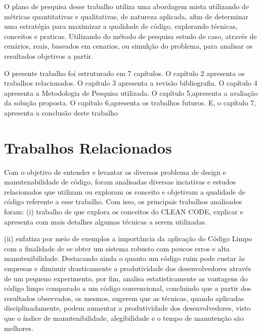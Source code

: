 \documentclass[12pt]{article}
\begin{document}
O plano de pesquisa desse trabalho utiliza uma abordagem mista utilizando de métricas quantitativas e qualitativas, de natureza aplicada, afim de determinar uma estratégia para maximizar a qualidade de código, explorando técnicas, conceitos e praticas. Utilizando do método de pesquisa estudo de caso, através de cenários, reais, baseados em cenarios, ou simulção do problema, para analisar os resultados objetivos a partir. 

O presente trabalho foi estruturado em 7 capítulos.
O capítulo 2 apresenta os trabalhos relacionados. 
O capítulo 3 apresenta a revisão bibliografia.
O capítulo 4 apresenta a Metodologia de Pesquisa utilizada. 
O capítulo 5,apresenta a avaliação da solução proposta.
O capítulo 6,apresenta os trabalhos futuros.
E, o capítulo 7, apresenta a conclusão deste trabalho

\part{Trabalhos Relacionados} \label{sec:trabalhosrelacionados}

Com o objetivo de entender e levantar os diversos problema de design e manutenabilidade de código, foram analisadas diversas inciativas e estudos relacionados que utilizam ou exploram os conceito e objetivam a qualidade de código referente a esse trabalho.
Com isso, os principais trabalhos analisados foram: (i) trabalho de \cite{TR_CLEAN_CODE_INTRODUCAO} que explora os conceitos do CLEAN CODE, explicar e apresenta com mais detalhes algumas técnicas a serem utilizadas.

 (ii) \cite{TR_CLEAN_CODE_IMPORTANCIA} enfatiza por meio de exemplos a importância da aplicação do
Código Limpo com a finalidade de se obter um sistema robusto com poucos erros e alta manutenibilidade. Destacando ainda o quanto um código ruim pode custar às empresas e diminuir drasticamente a produtividade dos desenvolvedores através de um pequeno experimento, por fim, analisa estatisticamente as vantagens do código limpo comparado a um código convencional, concluindo que a partir dos resultados observados, os mesmos, sugerem que as técnicas, quando aplicadas disciplinadamente, podem aumentar a produtividade dos desenvolvedores, visto que o índice de manutenibilidade, alegibilidade e o tempo de manutenção são melhores.
 
\end{document}
